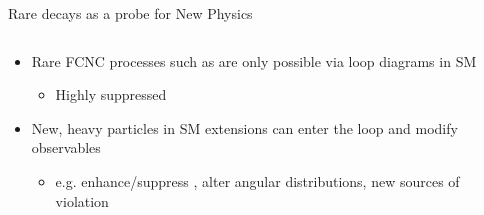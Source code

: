 \documentclass[aspectratio=1610]{beamer}
\begin{document}
\begin{frame}{Rare decays as a probe for New Physics}
  \begin{columns}
    \begin{column}{0.6\textwidth}
      \begin{itemize}
      \item Rare FCNC processes such as \btosll are only possible via loop diagrams in SM
        \begin{itemize}
        \item Highly suppressed
        \end{itemize}
      \item New, heavy particles in SM extensions can enter the loop and modify observables 
      \begin{itemize}
        \item e.g. enhance/suppress \BF, alter angular distributions, new sources of \CP violation
      \end{itemize}
      \end{itemize}
    \end{column}
    

\end{columns}
\end{frame}
\end{document}
